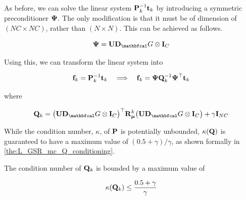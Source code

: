 As before, we can solve the linear system $\mathbf{P}^{-1}_k \mathbf{t}_k$ by introducing a symmetric preconditioner $\mathbf{\Psi}$. The only modification is that it must be of dimension of $(NC \times NC)$, rather than $(N \times N)$. This can be achieved as follows. 

\begin{equation*}
    \PSI = \U \D_\Gt \otimes \I_C 
\end{equation*}

Using this, we can transform the linear system into 

\begin{equation*}
    \mathbf{f}_k = \mathbf{P}^{-1}_k \mathbf{t}_k \quad \Longrightarrow \quad \mathbf{f}_k = \mathbf{\Psi} \mathbf{Q}_k^{-1} \mathbf{\Psi}^\top \mathbf{t}_k
\end{equation*}

where 

\begin{equation}
    \label{eq:Q_LGSR_mc}
    \Q_k = \big(\U \D_\Gt \otimes \I_C\big)^\top  \RR_{\muu}^k \big(\U \D_\Gt \otimes \I_C\big) + \gamma \I_{NC}
\end{equation}

While the condition number, $\kappa$, of $\mathbf{P}$ is potentially unbounded, $\kappa(\mathbf{Q})$ is guaranteed to have a maximum value of $(0.5 + \gamma) / \gamma$, as shown formally in \cref{the:L_GSR_mc_Q_conditioning}. 

\begin{theorem}
    \label{the:L_GSR_mc_Q_conditioning}
    
    The condition number of $\mathbf{Q}_k$ is bounded by a maximum value of 
    
    \begin{equation}
        \kappa(\mathbf{Q}_k) \leq \frac{0.5 + \gamma}{\gamma}
    \end{equation}

\end{theorem}

